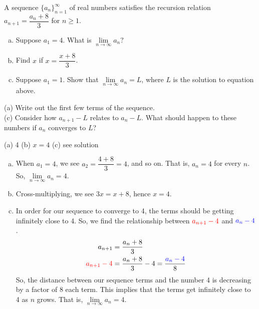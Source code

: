 \begin{question}
A sequence $\big\{a_n\big\}_{n=1}^\infty$ of real numbers satisfies the
recursion relation $a_{n+1} = \dfrac{a_n+8}{3}$ for $n\ge 1$.
\begin{enumerate}[(a)]
\item Suppose $a_1=4$. What is $\lim\limits_{n \to \infty}a_n$?
\item Find $x$ if  $x=\dfrac{x+8}{3}$.
\item Suppose $a_1=1$. Show that $\lim\limits_{n\rightarrow\infty} a_n = L$,
where $L$ is the solution to equation above.
\end{enumerate}
\end{question}

\begin{hint}
(a) Write out the first few terms of the sequence.\\
(c) Consider how $a_{n+1}-L$ relates to $a_{n}-L$. What should happen to these numbers if $a_n$ converges to $L$?
\end{hint}

\begin{answer}
(a) 4 \qquad (b) $x=4$\qquad
(c) see solution
\end{answer}

\begin{solution}
\begin{enumerate}[(a)]
\item When $a_1=4$, we see $a_2=\dfrac{4+8}{3}=4$, and so on. That is, $a_n=4$ for every $n$. So, $\lim\limits_{n \to \infty} a_n=4$.
\item Cross-multiplying, we see $3x=x+8$, hence $x=4$.
\item In order for our sequence to converge to 4, the terms should be getting infinitely close to 4. So, we find the relationship between $\textcolor{red}{a_{n+1}-4}$ and $\textcolor{blue}{a_n-4}$.
\begin{align*}
a_{n+1}&= \frac{a_n+8}{3} \\
\textcolor{red}{a_{n+1}-4}&= \frac{a_n+8}{3} -4=\frac{\textcolor{blue}{a_n-4}}{8}\\
\end{align*}
So, the distance between our sequence terms and the number 4 is decreasing by a factor of 8 each term. This implies that the terms get infinitely close to 4 as $n$ grows. That is, $\lim\limits_{n \to \infty}a_n=4$.
\end{enumerate}

\end{solution}

